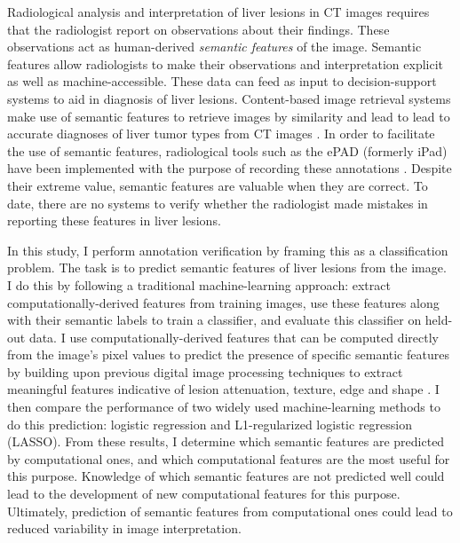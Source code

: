 Radiological analysis and interpretation of liver lesions in CT images requires that the radiologist report on observations about their findings. These observations act as human-derived \emph{semantic features} of the image. Semantic features allow radiologists to make their observations and interpretation explicit as well as machine-accessible. These data can feed as input to decision-support systems to aid in diagnosis of liver lesions. Content-based image retrieval systems make use of semantic features to retrieve images by similarity \cite{Napel:2010es} and lead to lead to accurate diagnoses of liver tumor types from CT images \cite{Korenblum:2011gx}. In order to facilitate the use of semantic features, radiological tools such as the ePAD (formerly iPad) have been implemented with the purpose of recording these annotations \cite{Rubin:2008uz}. Despite their extreme value, semantic features are valuable when they are correct. To date, there are no systems to verify whether the radiologist made mistakes in reporting these features in liver lesions.

In this study, I perform annotation verification by framing this as a classification problem. The task is to predict semantic features of liver lesions from the image. I do this by following a traditional machine-learning approach: extract computationally-derived features from training images, use these features along with their semantic labels to train a classifier, and evaluate this classifier on held-out data. I use computationally-derived features that can be computed directly from the image's pixel values to predict the presence of specific semantic features by building upon previous digital image processing techniques to extract meaningful features indicative of lesion attenuation, texture, edge and shape \cite{Strela:2002vq,Zhao:2005wb,Hong:2006ti,Manay:2006un,MRangayyan:2005td,Xu:2012bh}. I then compare the performance of two widely used machine-learning methods to do this prediction: logistic regression and L1-regularized logistic regression (LASSO). From these results, I determine which semantic features are predicted by computational ones, and which computational features are the most useful for this purpose. Knowledge of which semantic features are not predicted well could lead to the development of new computational features for this purpose. Ultimately, prediction of semantic features from computational ones could lead to reduced variability in image interpretation.




